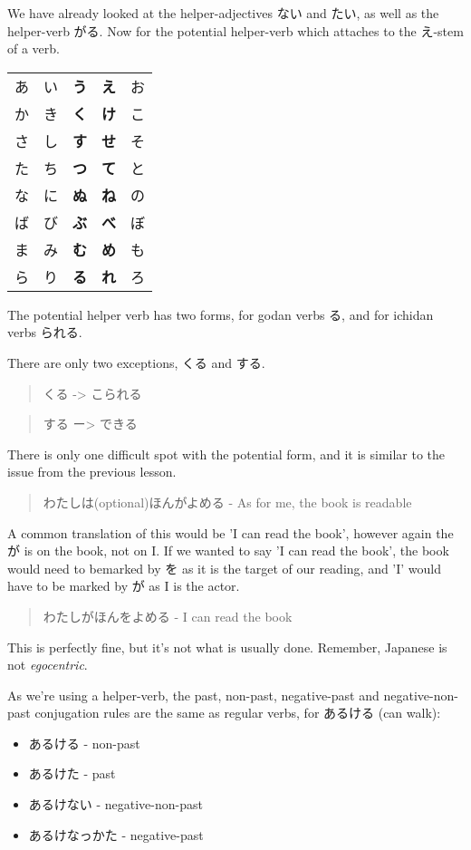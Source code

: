 \documentclass[11pt]{article}
\begin{document}
We have already looked at the helper-adjectives ない and たい, as well as the helper-verb がる. Now for the potential helper-verb which attaches to the え-stem of a verb.
\begin{center}
\begin{tabular}{lllll}
あ & い & \textbf{う} & \textbf{え} & お\\
か & き & \textbf{く} & \textbf{け} & こ\\
さ & し & \textbf{す} & \textbf{せ} & そ\\
た & ち & \textbf{つ} & \textbf{て} & と\\
な & に & \textbf{ぬ} & \textbf{ね} & の\\
ば & び & \textbf{ぶ} & \textbf{べ} & ぼ\\
ま & み & \textbf{む} & \textbf{め} & も\\
ら & り & \textbf{る} & \textbf{れ} & ろ\\
\end{tabular}
\end{center}

The potential helper verb has two forms, for godan verbs る, and for ichidan verbs られる.

There are only two exceptions, くる and する.
\begin{quote}
くる -> こられる
\end{quote}
\begin{quote}
する ー> できる
\end{quote}

There is only one difficult spot with the potential form, and it is similar to the issue from the previous lesson.
\begin{quote}
わたしは(optional)ほんがよめる - As for me, the book is readable
\end{quote}
A common translation of this would be 'I can read the book', however again the が is on the book, not on I. If we wanted to say 'I can read the book', the book would need to bemarked by を as it is the target of our reading, and 'I' would have to be marked by が as I is the actor.
\begin{quote}
わたしがほんをよめる - I can read the book
\end{quote}
This is perfectly fine, but it's not what is usually done. Remember, Japanese is not \emph{egocentric}.

As we're using a helper-verb, the past, non-past, negative-past and negative-non-past conjugation rules are the same as regular verbs, for あるける (can walk):
\begin{itemize}
\item あるける - non-past
\item あるけた - past
\item あるけない - negative-non-past
\item あるけなっかた - negative-past
\end{itemize}
\end{document}
